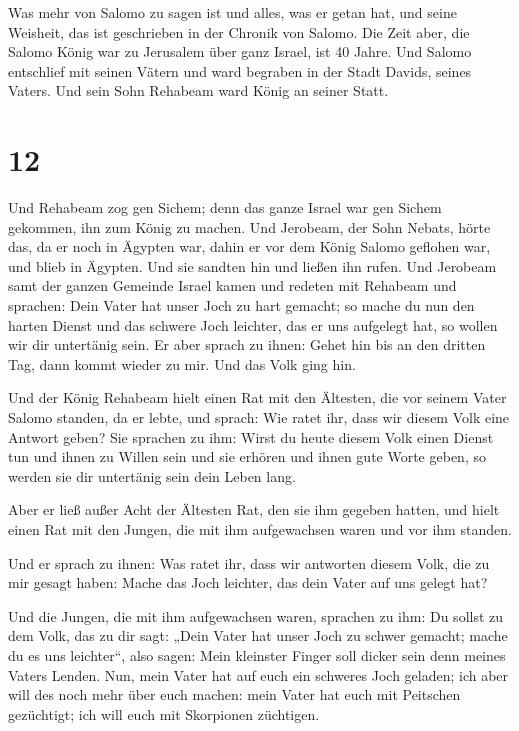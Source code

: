  Was mehr von Salomo zu sagen ist und alles, was er getan
hat, und seine Weisheit, das ist geschrieben in der Chronik von Salomo.
 Die Zeit aber, die Salomo König war zu Jerusalem über
ganz Israel, ist 40 Jahre.  Und Salomo entschlief mit
seinen Vätern und ward begraben in der Stadt Davids, seines Vaters. Und
sein Sohn Rehabeam ward König an seiner Statt.

\hypertarget{section-11}{%
\section{12}\label{section-11}}

 Und Rehabeam zog gen Sichem; denn das ganze Israel war
gen Sichem gekommen, ihn zum König zu machen.  Und
Jerobeam, der Sohn Nebats, hörte das, da er noch in Ägypten war, dahin
er vor dem König Salomo geflohen war, und blieb in Ägypten.
 Und sie sandten hin und ließen ihn rufen. Und Jerobeam
samt der ganzen Gemeinde Israel kamen und redeten mit Rehabeam und
sprachen:  Dein Vater hat unser Joch zu hart gemacht; so
mache du nun den harten Dienst und das schwere Joch leichter, das er uns
aufgelegt hat, so wollen wir dir untertänig sein.  Er aber
sprach zu ihnen: Gehet hin bis an den dritten Tag, dann kommt wieder zu
mir. Und das Volk ging hin.

 Und der König Rehabeam hielt einen Rat mit den Ältesten,
die vor seinem Vater Salomo standen, da er lebte, und sprach: Wie ratet
ihr, dass wir diesem Volk eine Antwort geben?  Sie
sprachen zu ihm: Wirst du heute diesem Volk einen Dienst tun und ihnen
zu Willen sein und sie erhören und ihnen gute Worte geben, so werden sie
dir untertänig sein dein Leben lang.

 Aber er ließ außer Acht der Ältesten Rat, den sie ihm
gegeben hatten, und hielt einen Rat mit den Jungen, die mit ihm
aufgewachsen waren und vor ihm standen.

 Und er sprach zu ihnen: Was ratet ihr, dass wir antworten
diesem Volk, die zu mir gesagt haben: Mache das Joch leichter, das dein
Vater auf uns gelegt hat?

 Und die Jungen, die mit ihm aufgewachsen waren, sprachen
zu ihm: Du sollst zu dem Volk, das zu dir sagt: „Dein Vater hat unser
Joch zu schwer gemacht; mache du es uns leichter``, also sagen: Mein
kleinster Finger soll dicker sein denn meines Vaters Lenden.
 Nun, mein Vater hat auf euch ein schweres Joch geladen;
ich aber will des noch mehr über euch machen: mein Vater hat euch mit
Peitschen gezüchtigt; ich will euch mit Skorpionen züchtigen.


